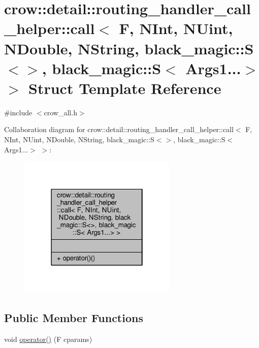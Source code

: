 \hypertarget{structcrow_1_1detail_1_1routing__handler__call__helper_1_1call_3_01_f_00_01_n_int_00_01_n_uint_0d7ef20f9a959e64c78052cf52ae9f097}{\section{crow\-:\-:detail\-:\-:routing\-\_\-handler\-\_\-call\-\_\-helper\-:\-:call$<$ F, N\-Int, N\-Uint, N\-Double, N\-String, black\-\_\-magic\-:\-:S$<$$>$, black\-\_\-magic\-:\-:S$<$ Args1...$>$ $>$ Struct Template Reference}
\label{structcrow_1_1detail_1_1routing__handler__call__helper_1_1call_3_01_f_00_01_n_int_00_01_n_uint_0d7ef20f9a959e64c78052cf52ae9f097}
}


{\ttfamily \#include $<$crow\-\_\-all.\-h$>$}



Collaboration diagram for crow\-:\-:detail\-:\-:routing\-\_\-handler\-\_\-call\-\_\-helper\-:\-:call$<$ F, N\-Int, N\-Uint, N\-Double, N\-String, black\-\_\-magic\-:\-:S$<$$>$, black\-\_\-magic\-:\-:S$<$ Args1...$>$ $>$\-:
\nopagebreak
\begin{figure}[H]
\begin{center}
\leavevmode
\includegraphics[width=214pt]{structcrow_1_1detail_1_1routing__handler__call__helper_1_1call_3_01_f_00_01_n_int_00_01_n_uint_029c710ab3edf15475f01770465a9b38f}
\end{center}
\end{figure}
\subsection*{Public Member Functions}
\begin{DoxyCompactItemize}
\item 
void \hyperlink{structcrow_1_1detail_1_1routing__handler__call__helper_1_1call_3_01_f_00_01_n_int_00_01_n_uint_0d7ef20f9a959e64c78052cf52ae9f097_af90f78b15d4bce039633be53471d9526}{operator()} (F cparams)
\end{DoxyCompactItemize}


